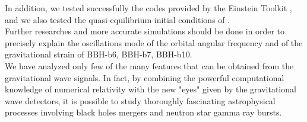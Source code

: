 In addition, we tested successfully the codes provided by the Einstein Toolkit \cite{EinsteinToolkit:web}, and we also tested the quasi-equilibrium initial conditions of \cite{tichy_quasi-equilibrium_2004}.\\
Further researches and more accurate simulations should be done in order to precisely explain the oscillations mode of the orbital angular frequency and of the gravitational strain of BBH-b6, BBH-b7, BBH-b10.\\
We have analyzed only few of the many features that can be obtained from the gravitational wave signals.
In fact, by combining the powerful computational knowledge of numerical relativity with the new "eyes" given by the gravitational wave detectors, it is possible to study thoroughly fascinating astrophysical processes involving black holes mergers and neutron star gamma ray bursts.




